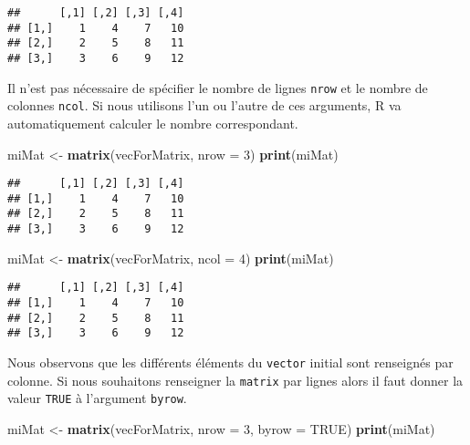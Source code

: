 \documentclass[]{book}
\newenvironment{Shaded}{\begin{snugshade}}{\end{snugshade}}
\newcommand{\KeywordTok}[1]{\textcolor[rgb]{0.13,0.29,0.53}{\textbf{#1}}}
\newcommand{\DataTypeTok}[1]{\textcolor[rgb]{0.13,0.29,0.53}{#1}}
\newcommand{\DecValTok}[1]{\textcolor[rgb]{0.00,0.00,0.81}{#1}}
\newcommand{\StringTok}[1]{\textcolor[rgb]{0.31,0.60,0.02}{#1}}
\newcommand{\OtherTok}[1]{\textcolor[rgb]{0.56,0.35,0.01}{#1}}
\newcommand{\NormalTok}[1]{#1}
\theoremstyle{definition}
\theoremstyle{definition}
\theoremstyle{definition}
\theoremstyle{remark}
\begin{document}
\begin{verbatim}
##      [,1] [,2] [,3] [,4]
## [1,]    1    4    7   10
## [2,]    2    5    8   11
## [3,]    3    6    9   12
\end{verbatim}

Il n'est pas nécessaire de spécifier le nombre de lignes \texttt{nrow}
et le nombre de colonnes \texttt{ncol}. Si nous utilisons l'un ou
l'autre de ces arguments, R va automatiquement calculer le nombre
correspondant.

\begin{Shaded}
\begin{Highlighting}[]
\NormalTok{miMat <-}\StringTok{ }\KeywordTok{matrix}\NormalTok{(vecForMatrix, }\DataTypeTok{nrow =} \DecValTok{3}\NormalTok{)}
\KeywordTok{print}\NormalTok{(miMat)}
\end{Highlighting}
\end{Shaded}

\begin{verbatim}
##      [,1] [,2] [,3] [,4]
## [1,]    1    4    7   10
## [2,]    2    5    8   11
## [3,]    3    6    9   12
\end{verbatim}

\begin{Shaded}
\begin{Highlighting}[]
\NormalTok{miMat <-}\StringTok{ }\KeywordTok{matrix}\NormalTok{(vecForMatrix, }\DataTypeTok{ncol =} \DecValTok{4}\NormalTok{)}
\KeywordTok{print}\NormalTok{(miMat)}
\end{Highlighting}
\end{Shaded}

\begin{verbatim}
##      [,1] [,2] [,3] [,4]
## [1,]    1    4    7   10
## [2,]    2    5    8   11
## [3,]    3    6    9   12
\end{verbatim}

Nous observons que les différents éléments du \texttt{vector} initial
sont renseignés par colonne. Si nous souhaitons renseigner la
\texttt{matrix} par lignes alors il faut donner la valeur \texttt{TRUE}
à l'argument \texttt{byrow}.

\begin{Shaded}
\begin{Highlighting}[]
\NormalTok{miMat <-}\StringTok{ }\KeywordTok{matrix}\NormalTok{(vecForMatrix, }\DataTypeTok{nrow =} \DecValTok{3}\NormalTok{, }\DataTypeTok{byrow =} \OtherTok{TRUE}\NormalTok{)}
\KeywordTok{print}\NormalTok{(miMat)}
\end{Highlighting}
\end{Shaded}
\end{document}
